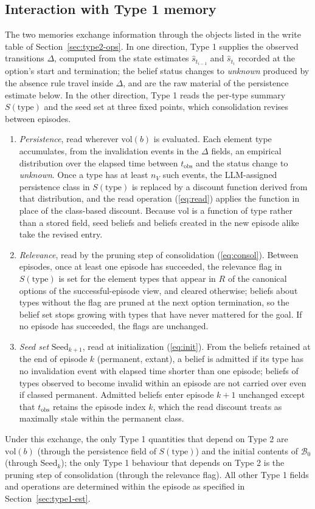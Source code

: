 \documentclass[11pt]{article}
\newcommand{\calB}{\mathcal{B}}
\newcommand{\Rel}{R}
\newcommand{\shat}{\hat{s}}
\newcommand{\vol}{\mathrm{vol}}
\newcommand{\type}{\mathrm{type}}
\newcommand{\tobs}{t_{\mathrm{obs}}}
\begin{document}
\subsection{Interaction with Type 1 memory}
\label{sec:type1-type2}

The two memories exchange information through the objects listed in the write table of Section~\ref{sec:type2-ops}. In one direction, Type 1 supplies the observed transitions $\Delta$, computed from the state estimates $\shat_{t_{i-1}}$ and $\shat_{t_i}$ recorded at the option's start and termination; the belief status changes to \emph{unknown} produced by the absence rule travel inside $\Delta$, and are the raw material of the persistence estimate below. In the other direction, Type 1 reads the per-type summary $S(\type)$ and the seed set at three fixed points, which consolidation revises between episodes.

\begin{enumerate}[leftmargin=1.5em,itemsep=1pt]
\item \emph{Persistence}, read wherever $\vol(b)$ is evaluated. Each element type accumulates, from the invalidation events in the $\Delta$ fields, an empirical distribution over the elapsed time between $\tobs$ and the status change to \emph{unknown}. Once a type has at least $n_V$ such events, the LLM-assigned persistence class in $S(\type)$ is replaced by a discount function derived from that distribution, and the read operation (\ref{eq:read}) applies the function in place of the class-based discount. Because $\vol$ is a function of type rather than a stored field, seed beliefs and beliefs created in the new episode alike take the revised entry.
\item \emph{Relevance}, read by the pruning step of consolidation (\ref{eq:consol}). Between episodes, once at least one episode has succeeded, the relevance flag in $S(\type)$ is set for the element types that appear in $\Rel$ of the canonical options of the successful-episode view, and cleared otherwise; beliefs about types without the flag are pruned at the next option termination, so the belief set stops growing with types that have never mattered for the goal. If no episode has succeeded, the flags are unchanged.
\item \emph{Seed set} $\mathrm{Seed}_{k+1}$, read at initialization (\ref{eq:init}). From the beliefs retained at the end of episode $k$ (permanent, extant), a belief is admitted if its type has no invalidation event with elapsed time shorter than one episode; beliefs of types observed to become invalid within an episode are not carried over even if classed permanent. Admitted beliefs enter episode $k+1$ unchanged except that $\tobs$ retains the episode index $k$, which the read discount treats as maximally stale within the permanent class.
\end{enumerate}

Under this exchange, the only Type 1 quantities that depend on Type 2 are $\vol(b)$ (through the persistence field of $S(\type)$) and the initial contents of $\calB_0$ (through $\mathrm{Seed}_k$); the only Type 1 behaviour that depends on Type 2 is the pruning step of consolidation (through the relevance flag). All other Type 1 fields and operations are determined within the episode as specified in Section~\ref{sec:type1-est}.
\end{document}
